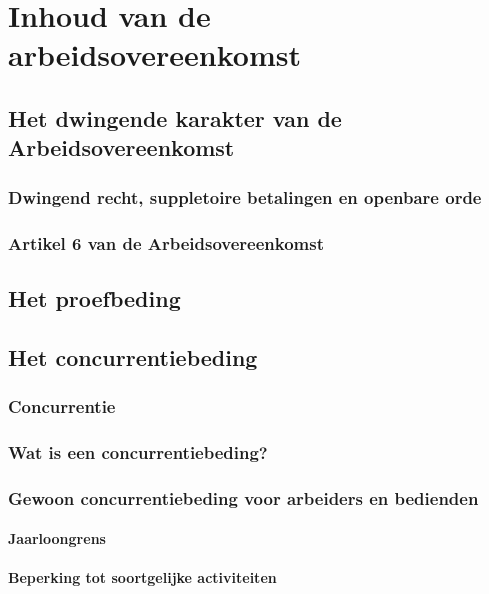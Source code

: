 \chapter{Inhoud van de arbeidsovereenkomst}
\label{hoofdstuk:2}

\section{Het dwingende karakter van de Arbeidsovereenkomst}

\subsection{Dwingend recht, suppletoire betalingen en openbare orde}

\subsection{Artikel 6 van de Arbeidsovereenkomst}

\section{Het proefbeding}

\section{Het concurrentiebeding}

\subsection{Concurrentie}

\subsection{Wat is een concurrentiebeding?}

\subsection{Gewoon concurrentiebeding voor arbeiders en bedienden}

\subsubsection{Jaarloongrens}

\subsubsection{Beperking tot soortgelijke activiteiten}

